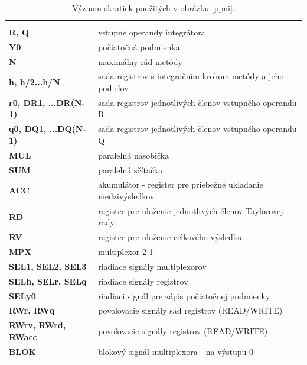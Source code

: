 \begin{table}[H]
\centering
\begin{tabular}{|
>{\columncolor[HTML]{DAE8FC}}l |l|}
\hline
\multicolumn{1}{|c|}{\cellcolor[HTML]{68CBD0}{\color[HTML]{000000} \textbf{Skratka}}} & \multicolumn{1}{c|}{\cellcolor[HTML]{68CBD0}{\color[HTML]{000000} \textbf{Popis}}} \\ \hline
\textbf{R, Q} & vstupné operandy integrátora \\ \hline
\textbf{Y0} & počiatočná podmienka \\ \hline
\textbf{N} & maximálny rád metódy \\ \hline
\textbf{h, h/2...h/N} & sada registrov s integračním krokom metódy a jeho podielov \\ \hline
\textbf{r0, DR1, ...DR(N-1)} & sada registrov jednotlivých členov vstupného operandu R \\ \hline
\textbf{q0, DQ1, ...DQ(N-1)} & sada registrov jednotlivých členov vstupného operandu Q \\ \hline
\textbf{MUL} & paralelná násobička \\ \hline
\textbf{SUM} & paralelná sčítačka \\ \hline
\textbf{ACC} & akumulátor - register pre priebežné ukladanie medzivýsledkov \\ \hline
\textbf{RD} & register pre uloženie jednotlivých členov Taylorovej rady \\ \hline
\textbf{RV} & register pre uloženie celkového výsledku \\ \hline
\textbf{MPX} & multiplexor 2-1 \\ \hline
\textbf{SEL1, SEL2, SEL3} & riadiace signály multiplexorov \\ \hline
\textbf{SELh, SELr, SELq} & riadiace signály registrov \\ \hline
\textbf{SELy0} & riadiaci signál pre zápis počiatočnej podmienky \\ \hline
\textbf{RWr, RWq} & povoľovacie signály sád registrov (READ/WRITE) \\ \hline
\textbf{RWrv, RWrd, RWacc} & povoľovacie signály registrov (READ/WRITE) \\ \hline
\textbf{BLOK} & blokový signál multiplexora - na výstupu 0 \\ \hline
\end{tabular}
\caption{Význam skratiek použitých v obrázku \ref{ppni}.}
\label{my-label}
\end{table}

